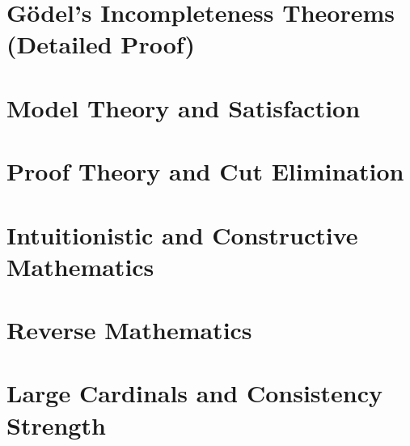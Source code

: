 \chapter{Gödel's Incompleteness Theorems (Detailed Proof)}
\chapter{Model Theory and Satisfaction}
\chapter{Proof Theory and Cut Elimination}
\chapter{Intuitionistic and Constructive Mathematics}
\chapter{Reverse Mathematics}
\chapter{Large Cardinals and Consistency Strength}
